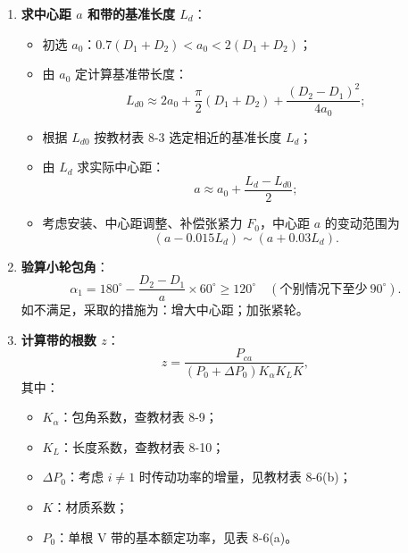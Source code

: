 \begin{enumerate}
	\item \textbf{求中心距 $a$ 和带的基准长度 $L_d$}：
	      \begin{itemize}
		      \item 初选 $a_0$：$0.7(D_1+D_2)<a_0<2(D_1+D_2)$；
		      \item 由 $a_0$ 定计算基准带长度：
		            \begin{equation}
			            L_{d0}\approx 2a_0+\frac{\pi}{2}(D_1+D_2)+\frac{(D_2-D_1)^2}{4a_0};
			            \label{eq:带传动:基准长度初值}
		            \end{equation}
		      \item 根据 $L_{d0}$ 按教材表 8-3 选定相近的基准长度 $L_d$；
		      \item 由 $L_d$ 求实际中心距：
		            \begin{equation}
			            a\approx a_0+\frac{L_d-L_{d0}}{2};
			            \label{eq:带传动:实际中心距}
		            \end{equation}
		      \item 考虑安装、中心距调整、补偿张紧力 $F_0$，中心距 $a$ 的变动范围为
		            \begin{equation}
			            (a-0.015L_d)\sim(a+0.03L_d).
			            \label{eq:带传动:中心距变动范围}
		            \end{equation}
	      \end{itemize}

	\item \textbf{验算小轮包角}：
	      \begin{equation}
		      \alpha_1=180^{\circ}-\frac{D_2-D_1}{a}\times 60^{\circ}\ge 120^{\circ}
		      \quad(\text{个别情况下至少}\ 90^{\circ}).
		      \label{eq:带传动:验算包角}
	      \end{equation}
	      如不满足，采取的措施为：增大中心距；加张紧轮。

	\item \textbf{计算带的根数 $z$}：
	      \begin{equation}
		      z=\frac{P_{ca}}{(P_0+\Delta P_0)K_\alpha K_L K},
		      \label{eq:带传动:根数}
	      \end{equation}
	      其中：
	      \begin{itemize}
		      \item $K_\alpha$：包角系数，查教材表 8-9；
		      \item $K_L$：长度系数，查教材表 8-10；
		      \item $\Delta P_0$：考虑 $i\neq1$ 时传动功率的增量，见教材表 8-6(b)；
		      \item $K$：材质系数；
		      \item $P_0$：单根 V 带的基本额定功率，见表 8-6(a)。
	      \end{itemize}


\end{enumerate}
